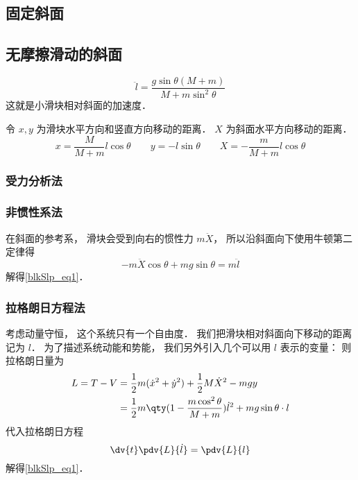 
\subsection{固定斜面}

\subsection{无摩擦滑动的斜面}
\begin{equation}\label{blkSlp_eq1}
\ddot l = \frac{g\sin\theta(M+m)}{M + m\sin^2\theta}
\end{equation}
这就是小滑块相对斜面的加速度．

令 $x, y$ 为滑块水平方向和竖直方向移动的距离． $X$ 为斜面水平方向移动的距离．
\begin{equation}
x = \frac{M}{M + m}l\cos\theta
\qquad
y = -l\sin\theta
\qquad
X = -\frac{m}{M + m}l\cos\theta
\end{equation}

\subsubsection{受力分析法}

\subsubsection{非惯性系法}
在斜面的参考系， 滑块会受到向右的惯性力 $m\ddot X$， 所以沿斜面向下使用牛顿第二定律得
\begin{equation}
-m\ddot X\cos\theta + mg\sin\theta = m\ddot l
\end{equation}
解得\autoref{blkSlp_eq1}．

\subsubsection{拉格朗日方程法}
考虑动量守恒， 这个系统只有一个自由度． 我们把滑块相对斜面向下移动的距离记为 $l$． 为了描述系统动能和势能， 我们另外引入几个可以用 $l$ 表示的变量：  则拉格朗日量为
\begin{equation}
\begin{aligned}
L = T - V &= \frac12 m(\dot x^2 + \dot y^2) + \frac12 M \dot X^2 - mgy\\
&= \frac{1}{2}m \qty(1 - \frac{m\cos^2\theta}{M + m}) \dot l^2 + mg\sin\theta \cdot l
\end{aligned}
\end{equation}
代入拉格朗日方程
\begin{equation}
\dv{t} \pdv{L}{\dot l} = \pdv{L}{l}
\end{equation}
解得\autoref{blkSlp_eq1}．
